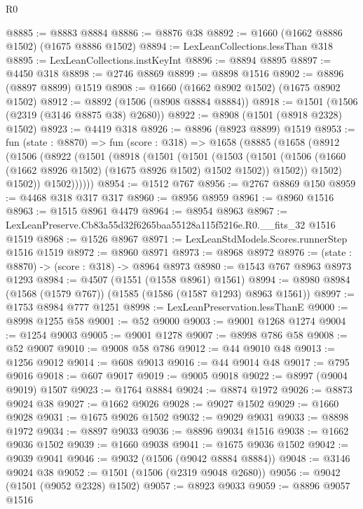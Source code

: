 \begin{lexlean}{R0}
\begin{coremodule}
@8885 := @8883 @8884
@8886 := @8876 @38
@8892 := @1660 (@1662 @8886 @1502) (@1675 @8886 @1502)
@8894 := LexLeanCollections.lessThan @318
@8895 := LexLeanCollections.instKeyInt
@8896 := @8894 @8895
@8897 := @4450 @318
@8898 := @2746 @8869
@8899 := @8898 @1516
@8902 := @8896 (@8897 @8899) @1519
@8908 := @1660 (@1662 @8902 @1502) (@1675 @8902 @1502)
@8912 := @8892 (@1506 (@8908 @8884 @8884))
@8918 := @1501 (@1506 (@2319 (@3146 @8875 @38) @2680))
@8922 := @8908 (@1501 (@8918 @2328) @1502)
@8923 := @4419 @318
@8926 := @8896 (@8923 @8899) @1519
@8953 := fun (state : @8870) =>
  fun (score : @318) =>
  @1658
    (@8885
      (@1658
        (@8912
          (@1506
            (@8922
              (@1501
                (@8918
                  (@1501
                    (@1501
                      (@1503
                        (@1501
                          (@1506 (@1660 (@1662 @8926 @1502) (@1675 @8926 @1502) @1502 @1502))
                          @1502))
                      @1502)
                    @1502))
                @1502))))))
@8954 := @1512 @767
@8956 := @2767 @8869 @150
@8959 := @4468 @318 @317 @317
@8960 := @8956 @8959
@8961 := @8960 @1516
@8963 := @1515 @8961 @4479
@8964 := @8954 @8963
@8967 := LexLeanPreserve.Cb83a55d32f6265baa55128a115f5216e.R0.__fits_32 @1516 @1519
@8968 := @1526 @8967
@8971 := LexLeanStdModels.Scores.runnerStep @1516 @1519
@8972 := @8960 @8971
@8973 := @8968 @8972
@8976 := (state : @8870) -> (score : @318) -> @8964 @8973
@8980 := @1543 @767 @8963 @8973 @1293
@8984 := @4507 (@1551 (@1558 @8961) @1561)
@8994 := @8980 @8984 (@1568 (@1579 @767)) (@1585 (@1586 (@1587 @1293) @8963 @1561))
@8997 := @1753 @8984 @777 @1251
@8998 := LexLeanPreservation.lessThanE
@9000 := @8998 @1255 @58
@9001 := @52 @9000
@9003 := @9001 @1268 @1274
@9004 := @1254 @9003
@9005 := @9001 @1278
@9007 := @8998 @786 @58
@9008 := @52 @9007
@9010 := @9008 @58 @786
@9012 := @44 @9010 @48
@9013 := @1256 @9012
@9014 := @608 @9013
@9016 := @44 @9014 @48
@9017 := @795 @9016
@9018 := @607 @9017
@9019 := @9005 @9018
@9022 := @8997 (@9004 @9019) @1507
@9023 := @1764 @8884
@9024 := @8874 @1972
@9026 := @8873 @9024 @38
@9027 := @1662 @9026
@9028 := @9027 @1502
@9029 := @1660 @9028
@9031 := @1675 @9026 @1502
@9032 := @9029 @9031
@9033 := @8898 @1972
@9034 := @8897 @9033
@9036 := @8896 @9034 @1516
@9038 := @1662 @9036 @1502
@9039 := @1660 @9038
@9041 := @1675 @9036 @1502
@9042 := @9039 @9041
@9046 := @9032 (@1506 (@9042 @8884 @8884))
@9048 := @3146 @9024 @38
@9052 := @1501 (@1506 (@2319 @9048 @2680))
@9056 := @9042 (@1501 (@9052 @2328) @1502)
@9057 := @8923 @9033
@9059 := @8896 @9057 @1516

\end{coremodule}
\end{lexlean}
